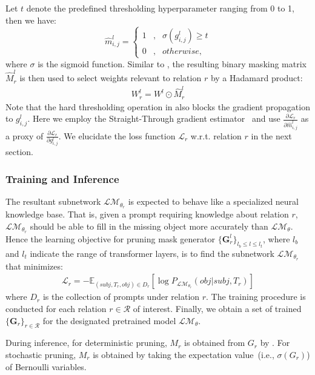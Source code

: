 Let $t$ denote the predefined thresholding hyperparameter ranging from 0 to 1, then we have:
\begin{equation}
\label{eq:hard}
\hat{m}_{i,j}^l=\left\{
\begin{aligned}
1 & , & \sigma(g_{i,j}^l)\ge t \\
0 & , & otherwise,
\end{aligned}
\right.
\end{equation}
where $\sigma$ is the sigmoid function. Similar to , the resulting binary masking matrix $\hat{M}_r^l$ is then used to select weights relevant to relation $r$ by a Hadamard product:
\begin{align}
	\label{eq:deterministic}
	W_r^l = W^l \odot \hat{M}_r^l
\end{align}
Note that the hard thresholding operation in  also blocks the gradient propagation to $g_{i,j}^l$. Here we employ the Straight-Through gradient estimator~\cite{NIPS2016_d8330f85,zhao2020} and use $\frac{\partial \mathcal{L}_r}{\partial \hat{m}_{i,j}^l}$ as a proxy of $\frac{\partial \mathcal{L}_r}{\partial g_{i,j}^l}$.  We elucidate the loss function $\mathcal{L}_r$ w.r.t. relation $r$ in the next section.


\subsubsection{Training and Inference}
\label{sec:training}
The resultant subnetwork $\mathcal{LM}_{\theta_r}$ is expected to behave like a specialized neural knowledge base. That is, given a prompt requiring knowledge about relation $r$, $\mathcal{LM}_{\theta_r}$ should be able to fill in the missing object more accurately than $\mathcal{LM}_{\theta}$. Hence the learning objective for pruning mask generator 
$\{\bm{G}_r^l\}_{l_b \leq l \leq l_t}$, where $l_b$ and $l_t$ indicate 
the range of transformer layers, is to find the subnetwork 
$\mathcal{LM}_{\theta_r}$ that minimizes:
\begin{align}
	\mathcal{L}_r=-\mathbb{E}_{(subj, T_r, obj)\in D_r}[\log{P_{\mathcal{LM}_{\theta_r}}(obj|subj, T_r)}]
	\label{eq:objective}
\end{align}
where $D_r$ is the collection of prompts under relation $r$. The training procedure is conducted for each relation $r\in \mathcal{R}$ of interest. Finally, we obtain a set of trained $\{\bm{G}_r\}_{r\in \mathcal{R}}$ for the designated pretrained model $\mathcal{LM}_\theta$.

During inference, for deterministic pruning, $M_r$ is obtained from $G_r$ by . For stochastic pruning, $M_r$ is obtained by taking the expectation value~(i.e., $\sigma(G_r)$) of Bernoulli variables.
